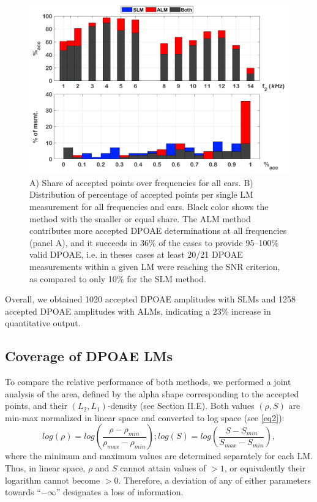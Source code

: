 \documentclass[journal,twoside,web]{ieeecolor2}
\begin{document}
\begin{figure}[ht]
\centerline{\includegraphics[width=\columnwidth]{Fig_Efficiency_v3.png}}
\caption{A) Share of accepted points over frequencies for all ears.
B) Distribution of percentage of accepted points per single LM measurement for all frequencies and ears.
Black color shows the method with the smaller or equal share. The ALM method contributes more accepted DPOAE determinations at all frequencies (panel A), and it succeeds in 36\% of the cases to provide 95–100\% valid DPOAE, i.e. in theses cases at least 20/21 DPOAE measurements within a given LM were reaching the SNR criterion, as compared to only 10\% for the SLM method.}
\label{fig_EFF}
\end{figure}

Overall, we obtained 1020 accepted DPOAE amplitudes with SLMs and 1258 accepted DPOAE amplitudes with ALMs, indicating a $23\%$ increase in quantitative output.

\subsection{Coverage of DPOAE LMs}
To compare the relative performance of both methods, we performed a joint analysis of the area, defined by the alpha shape corresponding to the accepted points, and their $(L_2, L_1)$-density (see Section II.E).
Both values $(\rho, S)$ are min-max normalized in linear space and converted to log space (see \eqref{eq2}):
\begin{equation} log(\rho) = log(\frac{\rho - \rho_{min}}{\rho_{max} - \rho_{min}}); log(S) = log(\frac{S - S_{min}}{S_{max} - S_{min}}), \label{eq2}\end{equation}
where the minimum and maximum values are determined separately for each LM.
Thus, in linear space, $\rho$ and $S$ cannot attain values of $> 1$, or equivalently their logarithm cannot become $> 0$.
Therefore, a deviation of any of either parameters towards “$-\infty$” designates a loss of information.
\end{document}
